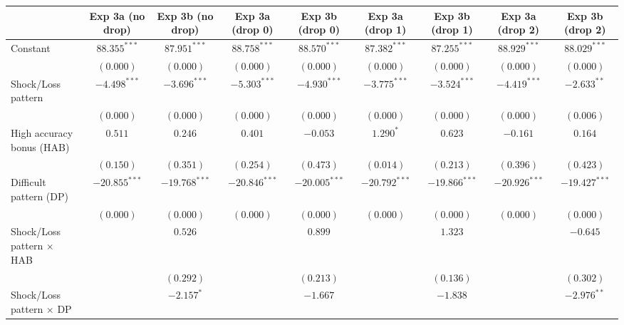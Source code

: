 
\begin{table}
\begin{center}
\begin{tabular}{l c c c c c c c c}
\hline
 & Exp 3a (no drop) & Exp 3b (no drop) & Exp 3a (drop 0) & Exp 3b (drop 0) & Exp 3a (drop 1) & Exp 3b (drop 1) & Exp 3a (drop 2) & Exp 3b (drop 2) \\
\hline
Constant                        & $88.355^{***}$  & $87.951^{***}$  & $88.758^{***}$  & $88.570^{***}$  & $87.382^{***}$  & $87.255^{***}$  & $88.929^{***}$  & $88.029^{***}$  \\
                                & $(0.000)$       & $(0.000)$       & $(0.000)$       & $(0.000)$       & $(0.000)$       & $(0.000)$       & $(0.000)$       & $(0.000)$       \\
Shock/Loss pattern              & $-4.498^{***}$  & $-3.696^{***}$  & $-5.303^{***}$  & $-4.930^{***}$  & $-3.775^{***}$  & $-3.524^{***}$  & $-4.419^{***}$  & $-2.633^{**}$   \\
                                & $(0.000)$       & $(0.000)$       & $(0.000)$       & $(0.000)$       & $(0.000)$       & $(0.000)$       & $(0.000)$       & $(0.006)$       \\
High accuracy bonus (HAB)       & $0.511$         & $0.246$         & $0.401$         & $-0.053$        & $1.290^{*}$     & $0.623$         & $-0.161$        & $0.164$         \\
                                & $(0.150)$       & $(0.351)$       & $(0.254)$       & $(0.473)$       & $(0.014)$       & $(0.213)$       & $(0.396)$       & $(0.423)$       \\
Difficult pattern (DP)          & $-20.855^{***}$ & $-19.768^{***}$ & $-20.846^{***}$ & $-20.005^{***}$ & $-20.792^{***}$ & $-19.866^{***}$ & $-20.926^{***}$ & $-19.427^{***}$ \\
                                & $(0.000)$       & $(0.000)$       & $(0.000)$       & $(0.000)$       & $(0.000)$       & $(0.000)$       & $(0.000)$       & $(0.000)$       \\
Shock/Loss pattern $\times$ HAB &                 & $0.526$         &                 & $0.899$         &                 & $1.323$         &                 & $-0.645$        \\
                                &                 & $(0.292)$       &                 & $(0.213)$       &                 & $(0.136)$       &                 & $(0.302)$       \\
Shock/Loss pattern $\times$ DP  &                 & $-2.157^{*}$    &                 & $-1.667$        &                 & $-1.838$        &                 & $-2.976^{**}$   \\

\end{tabular}
\end{center}
\end{table}
